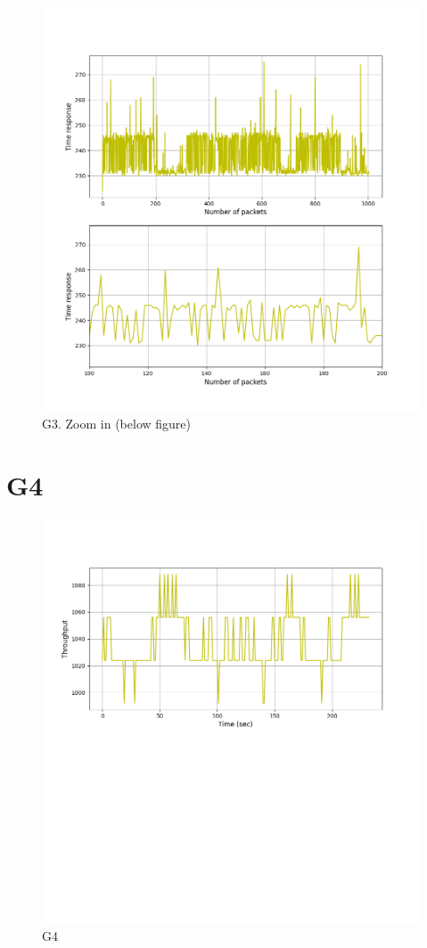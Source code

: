 \documentclass[hidelinks, 12pt, a4paper]{article}
\begin{document}
\begin{figure}[h!]
\centering
	\includegraphics[height=.38\textheight, width=\textwidth]{assets/session2/g3.png}
    \caption{G3. Zoom in (below figure)} 
\end{figure}

\section{G4}

\begin{figure}[h!]
\centering
	\includegraphics[height=.38\textheight, width=\textwidth]{assets/session2/g4.png}
	\caption{G4} 
\end{figure}
\end{document}
